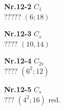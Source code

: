 \documentclass[12pt]{article}
\begin{document}
{\begin{minipage}[t]{3.5cm}
\epsfxsize=2.5cm
\par
{{\bf Nr.12-2} \quad $C_{1}$\\ $?????$ \quad $(6;18)$\\\vspace{3mm} }
\end{minipage}
\setlength{\unitlength}{1cm}
\begin{minipage}[t]{3.5cm}
\centering
\epsfxsize=2.5cm
\par
{{\bf Nr.12-3} \quad $C_{s}$\\ $????$ \quad $(10,14)$\\\vspace{3mm} }
\end{minipage}
\setlength{\unitlength}{1cm}
\begin{minipage}[t]{3.5cm}
\centering
\epsfxsize=2.5cm
\par
{{\bf Nr.12-4} \quad $C_{2v}$\\ $????$ \quad $(6^2;12)$\\\vspace{3mm} }
\end{minipage}
\setlength{\unitlength}{1cm}
\begin{minipage}[t]{3.5cm}
\centering
\epsfxsize=2.5cm
\par
{{\bf Nr.12-5} \quad $C_{s}$\\ $???$ \quad $(4^2;16)$ red.\\\vspace{3mm} }
\end{minipage}
}
\end{document}
